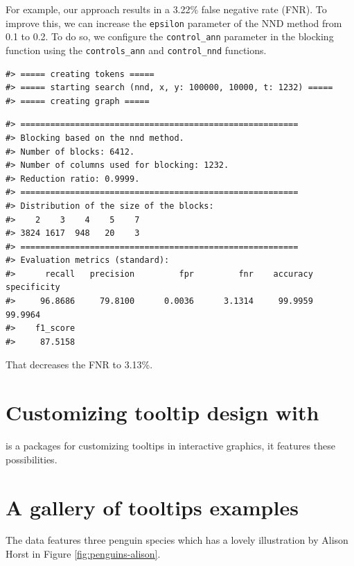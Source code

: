 For example, our approach results in a 3.22\% false negative rate (FNR). To improve this, we can increase the \texttt{epsilon} parameter of the NND method from 0.1 to 0.2. To do so, we configure the \texttt{control\_ann} parameter in the blocking function using the \texttt{controls\_ann} and \texttt{control\_nnd} functions.

\begin{verbatim}
#> ===== creating tokens =====
#> ===== starting search (nnd, x, y: 100000, 10000, t: 1232) =====
#> ===== creating graph =====
\end{verbatim}

\begin{verbatim}
#> ========================================================
#> Blocking based on the nnd method.
#> Number of blocks: 6412.
#> Number of columns used for blocking: 1232.
#> Reduction ratio: 0.9999.
#> ========================================================
#> Distribution of the size of the blocks:
#>    2    3    4    5    7 
#> 3824 1617  948   20    3 
#> ========================================================
#> Evaluation metrics (standard):
#>      recall   precision         fpr         fnr    accuracy specificity 
#>     96.8686     79.8100      0.0036      3.1314     99.9959     99.9964 
#>    f1_score 
#>     87.5158
\end{verbatim}

That decreases the FNR to 3.13\%.

\section{\texorpdfstring{Customizing tooltip design with }{Customizing tooltip design with }}\label{customizing-tooltip-design-with}

 is a packages for customizing tooltips in interactive graphics, it features these possibilities.

\section{A gallery of tooltips examples}\label{a-gallery-of-tooltips-examples}

The  data \citep{palmerpenguins} features three penguin species which has a lovely illustration by Alison Horst in Figure \ref{fig:penguins-alison}.

